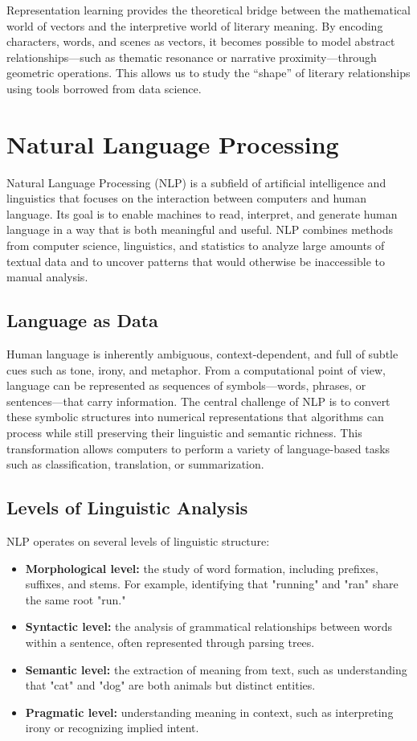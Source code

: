 \documentclass[a4paper,12pt]{report}
\begin{document}
Representation learning provides the theoretical bridge between the mathematical world of vectors and the interpretive world of literary meaning. 
By encoding characters, words, and scenes as vectors, it becomes possible to model abstract relationships—such as thematic resonance or narrative proximity—through geometric operations. \cite{BISHOP2006}
This allows us to study the “shape” of literary relationships using tools borrowed from data science.
\chapter{Natural Language Processing}
\label{chap:NLP}

Natural Language Processing (NLP) is a subfield of artificial intelligence and linguistics that focuses on the interaction between computers and human language. \cite{JURAFSKY}
Its goal is to enable machines to read, interpret, and generate human language in a way that is both meaningful and useful. 
NLP combines methods from computer science, linguistics, and statistics to analyze large amounts of textual data and to uncover patterns that would otherwise be inaccessible to manual analysis.

\section{Language as Data}
Human language is inherently ambiguous, context-dependent, and full of subtle cues such as tone, irony, and metaphor. 
From a computational point of view, language can be represented as sequences of symbols—words, phrases, or sentences—that carry information. 
The central challenge of NLP is to convert these symbolic structures into numerical representations that algorithms can process while still preserving their linguistic and semantic richness. 
This transformation allows computers to perform a variety of language-based tasks such as classification, translation, or summarization.

\section{Levels of Linguistic Analysis}
NLP operates on several levels of linguistic structure:

\begin{itemize}
    \item \textbf{Morphological level:} the study of word formation, including prefixes, suffixes, and stems. For example, identifying that "running" and "ran" share the same root "run."
    \item \textbf{Syntactic level:} the analysis of grammatical relationships between words within a sentence, often represented through parsing trees.
    \item \textbf{Semantic level:} the extraction of meaning from text, such as understanding that "cat" and "dog" are both animals but distinct entities.
    \item \textbf{Pragmatic level:} understanding meaning in context, such as interpreting irony or recognizing implied intent.
\end{itemize}
\end{document}
